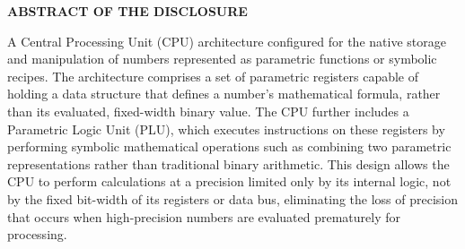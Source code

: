 \documentclass[11pt,letterpaper]{article}
\begin{document}
\thispagestyle{empty}

\begin{center}
    \textbf{\large ABSTRACT OF THE DISCLOSURE}
\end{center}

\vspace{0.6cm}

A Central Processing Unit (CPU) architecture configured for the native storage and manipulation of numbers represented as parametric functions or symbolic recipes. The architecture comprises a set of parametric registers capable of holding a data structure that defines a number's mathematical formula, rather than its evaluated, fixed-width binary value. The CPU further includes a Parametric Logic Unit (PLU), which executes instructions on these registers by performing symbolic mathematical operations such as combining two parametric representations rather than traditional binary arithmetic. This design allows the CPU to perform calculations at a precision limited only by its internal logic, not by the fixed bit-width of its registers or data bus, eliminating the loss of precision that occurs when high-precision numbers are evaluated prematurely for processing.
\end{document}
